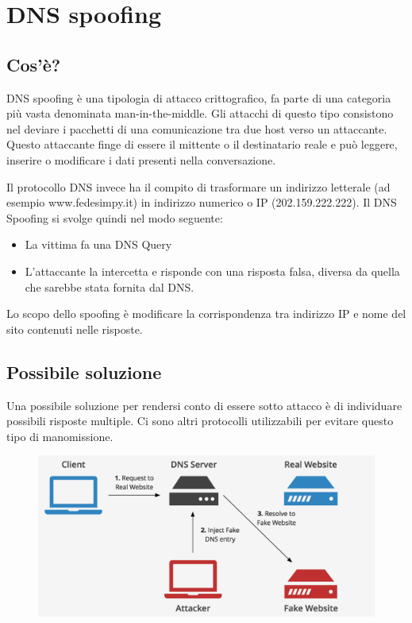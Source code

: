 \section{DNS spoofing}
\subsection{Cos'è?}
DNS spoofing è una tipologia di attacco crittografico, fa parte di una categoria più vasta denominata man-in-the-middle. Gli attacchi di questo tipo consistono nel deviare i pacchetti di una comunicazione tra due host verso un attaccante. Questo attaccante finge di essere il mittente o il destinatario reale e può leggere, inserire o modificare i dati presenti nella conversazione.

Il protocollo DNS invece ha il compito di trasformare un indirizzo letterale (ad esempio www.fedesimpy.it) in indirizzo numerico o IP (202.159.222.222).
Il DNS Spoofing si svolge quindi nel modo seguente: 
\begin{itemize}
\item	La vittima fa una DNS Query
\item	L'attaccante la intercetta e risponde con una risposta falsa, diversa da quella che sarebbe stata fornita dal DNS.
\end{itemize}
Lo scopo dello spoofing è modificare la corrispondenza tra indirizzo IP e nome del sito contenuti nelle risposte.
\subsection{Possibile soluzione}
Una possibile soluzione per rendersi conto di essere sotto attacco è di individuare possibili risposte multiple. Ci sono altri protocolli utilizzabili per evitare questo tipo di manomissione.

\begin{figure}[H]
\centering
\includegraphics[scale=0.35]{res/img/65_DNSSpoofing.png}
\end{figure}

